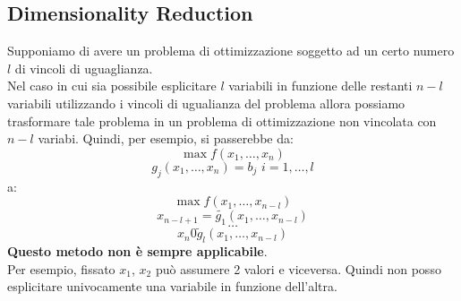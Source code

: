 \documentclass[a4paper,12pt, oneside]{book}
\begin{document}
\subsection{Dimensionality Reduction}
Supponiamo di avere un problema di ottimizzazione soggetto ad un certo
numero $l$ di vincoli di uguaglianza.\\
Nel caso in cui sia possibile esplicitare $l$ variabili in funzione delle
restanti $n-l$ variabili utilizzando i vincoli di ugualianza del problema
allora possiamo trasformare tale problema in un problema di
ottimizzazione non vincolata con $n-l$ variabi. Quindi, per esempio,
si passerebbe da:
\[\max f(x_1,\ldots, x_n)\]
\[g_j(x_1,\ldots, x_n)=b_j\,\,i=1,\ldots, l\]
a:
\[\max f(x_1,\ldots, x_{n-l})\]
\[x_{n-l+1}=\widetilde{g_1}(x_1,\ldots, x_{n-l})\]
\[\ldots\]
\[x_n0\widetilde{g}_l(x_1,\ldots,x_{n-l})\]
\textbf{Questo metodo non è sempre applicabile}.\\
Per esempio, fissato $x_1$, $x_2$ può assumere 2 valori e viceversa.
Quindi non posso esplicitare univocamente una variabile in funzione
dell’altra.  
\end{document}
